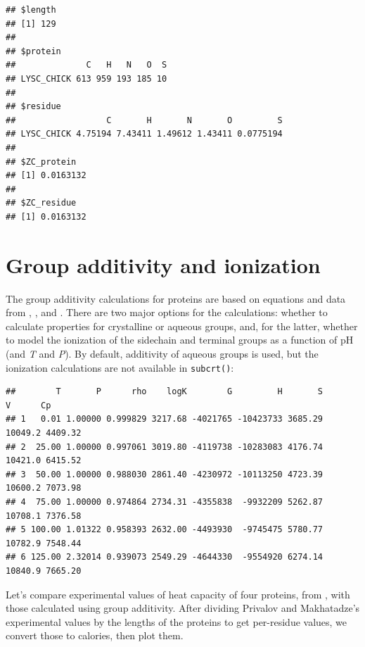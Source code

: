 \documentclass[]{tufte-book}
\newenvironment{Shaded}{}{}
\newcommand{\KeywordTok}[1]{\textcolor[rgb]{0.00,0.44,0.13}{\textbf{#1}}}
\newcommand{\DecValTok}[1]{\textcolor[rgb]{0.25,0.63,0.44}{#1}}
\newcommand{\StringTok}[1]{\textcolor[rgb]{0.25,0.44,0.63}{#1}}
\newcommand{\OperatorTok}[1]{\textcolor[rgb]{0.40,0.40,0.40}{#1}}
\newcommand{\NormalTok}[1]{#1}
\begin{document}
\begin{verbatim}
## $length
## [1] 129
## 
## $protein
##              C   H   N   O  S
## LYSC_CHICK 613 959 193 185 10
## 
## $residue
##                  C       H       N       O         S
## LYSC_CHICK 4.75194 7.43411 1.49612 1.43411 0.0775194
## 
## $ZC_protein
## [1] 0.0163132
## 
## $ZC_residue
## [1] 0.0163132
\end{verbatim}

\section{Group additivity and
ionization}\label{group-additivity-and-ionization}

The group additivity calculations for proteins are based on equations
and data from \citet{AH00}, \citet{DLH06}, and \citet{LD12}. There are
two major options for the calculations: whether to calculate properties
for crystalline or aqueous groups, and, for the latter, whether to model
the ionization of the sidechain and terminal groups as a function of pH
(and \emph{T} and \emph{P}). By default, additivity of aqueous groups is
used, but the ionization calculations are not available in
\texttt{subcrt()}:

\begin{Shaded}
\end{Shaded}

\begin{verbatim}
##        T       P      rho    logK        G         H       S       V      Cp
## 1   0.01 1.00000 0.999829 3217.68 -4021765 -10423733 3685.29 10049.2 4409.32
## 2  25.00 1.00000 0.997061 3019.80 -4119738 -10283083 4176.74 10421.0 6415.52
## 3  50.00 1.00000 0.988030 2861.40 -4230972 -10113250 4723.39 10600.2 7073.98
## 4  75.00 1.00000 0.974864 2734.31 -4355838  -9932209 5262.87 10708.1 7376.58
## 5 100.00 1.01322 0.958393 2632.00 -4493930  -9745475 5780.77 10782.9 7548.44
## 6 125.00 2.32014 0.939073 2549.29 -4644330  -9554920 6274.14 10840.9 7665.20
\end{verbatim}

Let's compare experimental values of heat capacity of four proteins,
from \citet{PM90}, with those calculated using group additivity. After
dividing Privalov and Makhatadze's experimental values by the lengths of
the proteins to get per-residue values, we convert those to calories,
then plot them.
\end{document}
